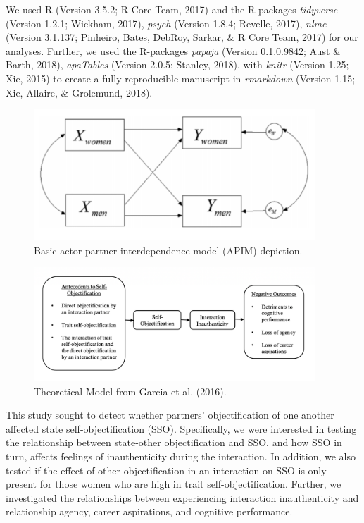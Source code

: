 \documentclass[man]{apa6}
\begin{document}
We used R (Version 3.5.2; R Core Team, 2017) and the R-packages
\emph{tidyverse} (Version 1.2.1; Wickham, 2017), \emph{psych} (Version
1.8.4; Revelle, 2017), \emph{nlme} (Version 3.1.137; Pinheiro, Bates,
DebRoy, Sarkar, \& R Core Team, 2017) for our analyses. Further, we used
the R-packages \emph{papaja} (Version 0.1.0.9842; Aust \& Barth, 2018),
\emph{apaTables} (Version 2.0.5; Stanley, 2018), with \emph{knitr}
(Version 1.25; Xie, 2015) to create a fully reproducible manuscript in
\emph{rmarkdown} (Version 1.15; Xie, Allaire, \& Grolemund, 2018).

\begin{figure}
\includegraphics[width=400px]{APIM_figure} \caption{Basic actor-partner interdependence model (APIM) depiction.}\label{fig:apim}
\end{figure}

\begin{figure}
\includegraphics[width=400px]{theor_figure} \caption{Theoretical Model from Garcia et al. (2016).}\label{fig:theorfigure}
\end{figure}

This study sought to detect whether partners' objectification of one
another affected state self-objectification (SSO). Specifically, we were
interested in testing the relationship between state-other
objectification and SSO, and how SSO in turn, affects feelings of
inauthenticity during the interaction. In addition, we also tested if
the effect of other-objectification in an interaction on SSO is only
present for those women who are high in trait self-objectification.
Further, we investigated the relationships between experiencing
interaction inauthenticity and relationship agency, career aspirations,
and cognitive performance.
\end{document}
